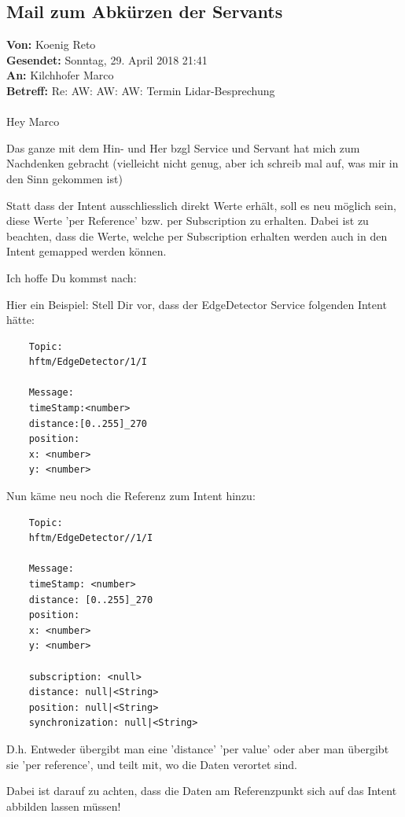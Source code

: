 \subsection{Mail zum Abkürzen der Servants}
\label{sec:servant-abkuerzern-referenz}
\begin{formal}
	\textbf{Von:} Koenig Reto\\
	\textbf{Gesendet:} Sonntag, 29. April 2018 21:41\\
	\textbf{An:} Kilchhofer Marco\\
	\textbf{Betreff:} Re: AW: AW: AW: Termin Lidar-Besprechung\\
	\\
	Hey Marco
	
	Das ganze mit dem Hin- und Her bzgl Service und Servant hat mich zum 
	Nachdenken gebracht (vielleicht nicht genug, aber ich schreib mal auf, was mir 
	in den Sinn gekommen ist)
	
	Statt dass der Intent ausschliesslich direkt Werte erhält, soll es neu möglich sein, diese Werte 'per Reference' bzw. per Subscription zu erhalten. Dabei ist zu beachten, dass die Werte, welche per Subscription erhalten werden auch in den Intent gemapped werden können.
	
	Ich hoffe Du kommst nach:
	
	Hier ein Beispiel:
	Stell Dir vor, dass der EdgeDetector Service folgenden Intent hätte:
	
	\begin{verbatim}
	Topic:
	hftm/EdgeDetector/1/I
	
	Message:
	timeStamp:<number>
	distance:[0..255]_270
	position:
	x: <number>
	y: <number>
	\end{verbatim}
	
	Nun käme neu noch die Referenz zum Intent hinzu:
	\begin{verbatim}
	Topic:
	hftm/EdgeDetector//1/I
	
	Message:
	timeStamp: <number>
	distance: [0..255]_270
	position:
	x: <number>
	y: <number>
	
	subscription: <null>
	distance: null|<String>
	position: null|<String>
	synchronization: null|<String>
	\end{verbatim}
	
	D.h.
	Entweder übergibt man eine 'distance' 'per value' oder aber man übergibt sie 'per reference', und teilt mit, wo die Daten verortet sind.
	
	Dabei ist darauf zu achten, dass die Daten am Referenzpunkt sich auf das Intent abbilden lassen müssen!
	

\end{formal}
